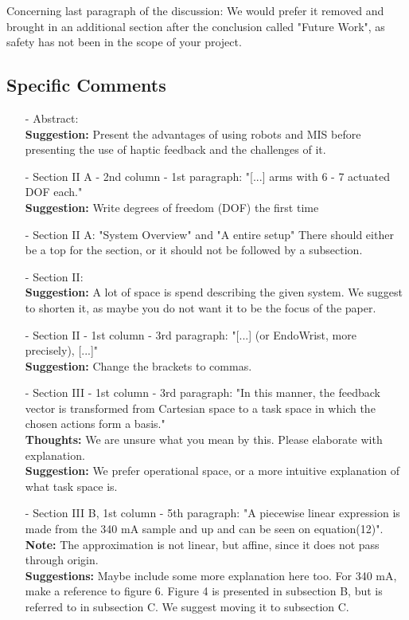 \vspace{-7pt}\noindent
Concerning last paragraph of the discussion: We would prefer it removed and brought in an additional section after the conclusion called "Future Work", as safety has not been in the scope of your project.

\subsection{Specific Comments}
\begin{itemize}
	\item[-] Abstract: \\
           \textbf{Suggestion:} Present the advantages of using robots and MIS before presenting the use of haptic feedback and the challenges of it. 

	\item[-] Section II A - 2nd column - 1st paragraph: "[...] arms with 6 - 7 actuated DOF each." \\
           \textbf{Suggestion:} Write degrees of freedom (DOF) the first time

	\item[-] Section II A: "System Overview" and "A entire setup"
	         There should either be a top for the section, or it should not be followed by a subsection.

	\item[-] Section II: \\
           \textbf{Suggestion:} A lot of space is spend describing the given system. We suggest to shorten it, as maybe you do not want it to be the focus of the paper. 

	\item[-] Section II - 1st column - 3rd paragraph: "[...] (or EndoWrist, more precisely), [...]"\\
           \textbf{Suggestion:} Change the brackets to commas. 

	\item[-] Section III - 1st column - 3rd paragraph: "In this manner, the feedback vector is transformed from Cartesian space to a task space in which the chosen actions form a basis."\\
           \textbf{Thoughts:} We are unsure what you mean by this. Please elaborate with explanation.\\
           \textbf{Suggestion:} We prefer operational space, or a more intuitive explanation of what task space is.
\pagebreak
	\item[-] Section III B, 1st column - 5th paragraph: "A piecewise linear expression is made from the 340 mA sample and up and can be seen on equation(12)". \\
           \textbf{Note:} The approximation is not linear, but affine, since it does not pass through origin.\\
           \textbf{Suggestions:} Maybe include some more explanation here too. For 340 mA, make a reference to figure 6. Figure 4 is presented in subsection B, but is referred to in subsection C. We suggest moving it to subsection C.


\end{itemize}
